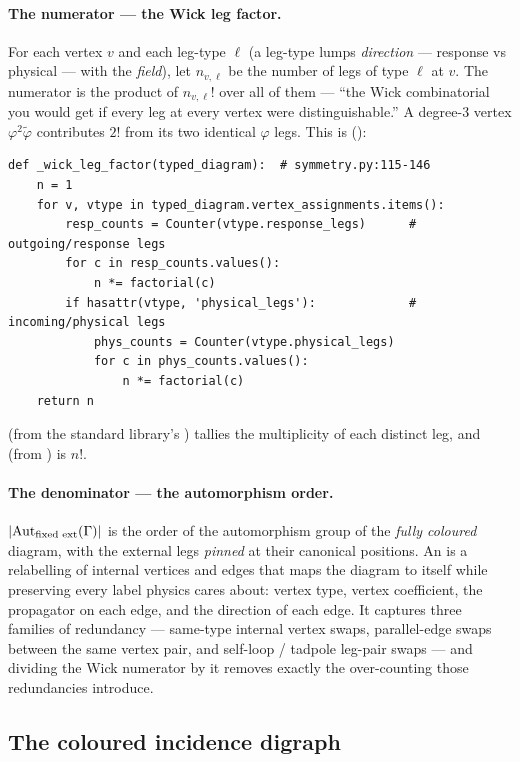 \paragraph{The numerator --- the Wick leg factor.} For each vertex $v$ and each
leg-type $\ell$ (a leg-type lumps \emph{direction} --- response vs physical ---
with the \emph{field}), let $n_{v,\ell}$ be the number of legs of type $\ell$ at
$v$. The numerator is the product of $n_{v,\ell}!$ over all of them --- ``the Wick
combinatorial you would get if every leg at every vertex were distinguishable.''
A degree-3 vertex $\varphi^2\tilde\varphi$ contributes $2!$ from its two
identical $\varphi$ legs. This is 
():

\begin{lstlisting}
def _wick_leg_factor(typed_diagram):  # symmetry.py:115-146
    n = 1
    for v, vtype in typed_diagram.vertex_assignments.items():
        resp_counts = Counter(vtype.response_legs)      # outgoing/response legs
        for c in resp_counts.values():
            n *= factorial(c)
        if hasattr(vtype, 'physical_legs'):             # incoming/physical legs
            phys_counts = Counter(vtype.physical_legs)
            for c in phys_counts.values():
                n *= factorial(c)
    return n
\end{lstlisting}

 (from the standard library's ) tallies the
multiplicity of each distinct leg, and  (from ) is
$n!$.

\paragraph{The denominator --- the automorphism order.}
$|\mathrm{Aut}_{\text{fixed ext}}(\Gamma)|$ is the order of the automorphism group of the
\emph{fully coloured} diagram, with the external legs \emph{pinned} at their
canonical positions. An  is a relabelling of internal vertices
and edges that maps the diagram to itself while preserving every label physics
cares about: vertex type, vertex coefficient, the propagator on each edge, and
the direction of each edge. It captures three families of redundancy ---
same-type internal vertex swaps, parallel-edge swaps between the same vertex
pair, and self-loop / tadpole leg-pair swaps --- and dividing the Wick numerator
by it removes exactly the over-counting those redundancies introduce.

\subsection{The coloured incidence digraph}

